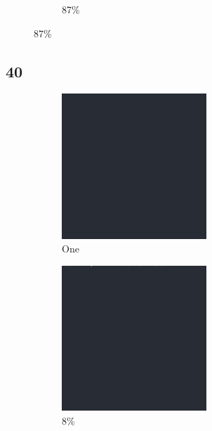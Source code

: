\documentclass[12pt, fleqn]{report}                             %
\theoremstyle{break}                                            %
\begin{document}
\begin{figure}[ht!]
\begin{subfigure}[b]{0.4\linewidth}
          \caption{87\%}
        \end{subfigure}
      \end{figure}


      \clearpage
      \subsection{40}
      \begin{figure}[ht!]
        \centering
        \begin{subfigure}[b]{0.4\linewidth}
          \includegraphics[width=0.6\textwidth]{Images/40/a.png}
          \caption{One}
        \end{subfigure}
        \begin{subfigure}[b]{0.4\linewidth}
          \includegraphics[width=0.6\textwidth]{Images/40/b.png}
          \caption{8\%}
        \end{subfigure}
        \begin{subfigure}[b]{0.4\linewidth}

\end{subfigure}
\end{figure}
\end{document}
